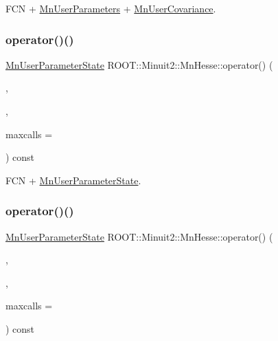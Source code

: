 F\+CN + \mbox{\hyperlink{classROOT_1_1Minuit2_1_1MnUserParameters}{Mn\+User\+Parameters}} + \mbox{\hyperlink{classROOT_1_1Minuit2_1_1MnUserCovariance}{Mn\+User\+Covariance}}. 

\mbox{\label{classROOT_1_1Minuit2_1_1MnHesse_a4ebea568262a19a0cfec1473ce7a5f0f}} 
\subsubsection{\texorpdfstring{operator()()}{operator()()}\hspace{0.1cm}{\footnotesize\ttfamily [16/24]}}
{\footnotesize\ttfamily \mbox{\hyperlink{classROOT_1_1Minuit2_1_1MnUserParameterState}{Mn\+User\+Parameter\+State}} R\+O\+O\+T\+::\+Minuit2\+::\+Mn\+Hesse\+::operator() (\begin{DoxyParamCaption}\item[{const \mbox{\hyperlink{classROOT_1_1Minuit2_1_1FCNBase}{F\+C\+N\+Base}} \&}]{,  }\item[{const \mbox{\hyperlink{classROOT_1_1Minuit2_1_1MnUserParameterState}{Mn\+User\+Parameter\+State}} \&}]{,  }\item[{unsigned int}]{maxcalls = {} }\end{DoxyParamCaption}) const}



F\+CN + \mbox{\hyperlink{classROOT_1_1Minuit2_1_1MnUserParameterState}{Mn\+User\+Parameter\+State}}. 

\mbox{\label{classROOT_1_1Minuit2_1_1MnHesse_a4ebea568262a19a0cfec1473ce7a5f0f}} 
\subsubsection{\texorpdfstring{operator()()}{operator()()}\hspace{0.1cm}{\footnotesize\ttfamily [17/24]}}
{\footnotesize\ttfamily \mbox{\hyperlink{classROOT_1_1Minuit2_1_1MnUserParameterState}{Mn\+User\+Parameter\+State}} R\+O\+O\+T\+::\+Minuit2\+::\+Mn\+Hesse\+::operator() (\begin{DoxyParamCaption}\item[{const \mbox{\hyperlink{classROOT_1_1Minuit2_1_1FCNBase}{F\+C\+N\+Base}} \&}]{,  }\item[{const \mbox{\hyperlink{classROOT_1_1Minuit2_1_1MnUserParameterState}{Mn\+User\+Parameter\+State}} \&}]{,  }\item[{unsigned int}]{maxcalls = {} }\end{DoxyParamCaption}) const}



